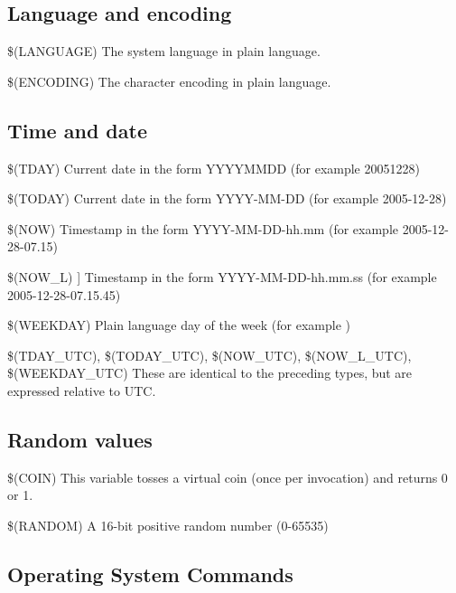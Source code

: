 \subsection{Language and encoding}

\begin{codeentry}
\item[\$(LANGUAGE)] The system language in plain language.
\item[\$(ENCODING)] The character encoding in plain language.
\end{codeentry}

\subsection{Time and date}

\begin{codeentry}
\item[\$(TDAY)] Current date in the form YYYYMMDD (for example 20051228)
\item[\$(TODAY)] Current date in the form YYYY-MM-DD (for example 2005-12-28)
\item[\$(NOW)] Timestamp in the form YYYY-MM-DD-hh.mm (for example 2005-12-28-07.15)
\item[\$(NOW\_L)]] Timestamp in the form YYYY-MM-DD-hh.mm.ss (for example 2005-12-28-07.15.45)
\item[\$(WEEKDAY)]  Plain language day of the week (for example )
\item[\$(TDAY\_UTC), \$(TODAY\_UTC), \$(NOW\_UTC), \$(NOW\_L\_UTC), \$(WEEKDAY\_UTC)] These are identical to the preceding types, but are expressed relative to UTC.
\end{codeentry}

\subsection{Random values}

\begin{codeentry}
\item[\$(COIN)] This variable tosses a virtual coin (once per invocation) and returns 0 or 1.
\item[\$(RANDOM)] A 16-bit positive random number (0-65535)
\end{codeentry}

\subsection{Operating System Commands}

